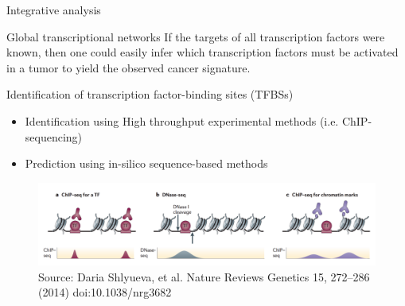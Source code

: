 \documentclass[slidestop,compress,11pt,xcolor=dvipsnames]{beamer}
\begin{document}
\begin{frame}{Integrative analysis}
 \vspace*{-0.3cm}
\begin{block}{Global transcriptional networks}
If the targets of all transcription factors were known, then one could easily infer which transcription factors must be activated in a tumor to yield the observed cancer signature.
\end{block}
\begin{exampleblock}{ Identification of transcription factor-binding sites (TFBSs)}
\begin{itemize}
     \item Identification using High throughput experimental methods (i.e. ChIP-sequencing)
     \item Prediction using in-silico sequence-based methods
\end{itemize}
\end{exampleblock}
\vspace*{-0.3cm}
\begin{figure}
 \centering
 \includegraphics[width=1.0\linewidth]{intro/TF.png}{\tiny{\\Source: Daria Shlyueva, et al. Nature Reviews Genetics 15, 272–286 (2014) doi:10.1038/nrg3682}}
\end{figure}
\end{frame}
\end{document}
